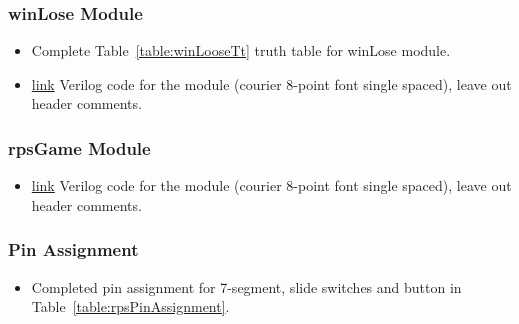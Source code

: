 \subsubsection{winLose Module}
\begin{itemize}
\item Complete Table~\ref{table:winLooseTt} truth table for winLose module.
\item \protect\hyperlink{winLoose_Verilog}{link} Verilog code for the module
(courier 8-point font single spaced), leave out header comments.
\end{itemize}

\subsubsection{rpsGame Module}
\begin{itemize}
\item \protect\hyperlink{play2Seven_Verilog}{link} Verilog code for the module
(courier 8-point font single spaced), leave out header comments.
\end{itemize}

\subsubsection{Pin Assignment}
\begin{itemize}
\item Completed pin assignment for 7-segment, slide switches and button in Table~\ref{table:rpsPinAssignment}.
\end{itemize}


